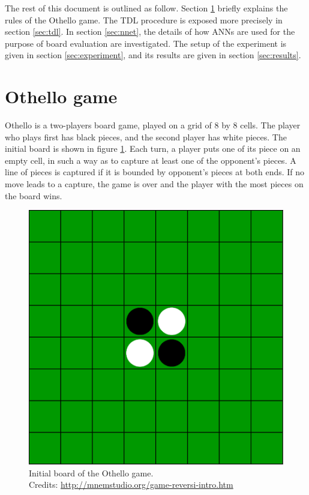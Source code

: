 \documentclass[a4paper, 9pt, twoside, twocolumn]{article}
\begin{document}
The rest of this document is outlined as follow. Section \ref{sec:othello} briefly
explains the rules of the Othello game. The TDL procedure is exposed more
precisely in section \ref{sec:tdl}. In section \ref{sec:nnet}, the details of
how ANNs are used for the purpose of board evaluation are investigated. The
setup of the experiment is given in section \ref{sec:experiment}, and its results
are given in section \ref{sec:results}.

\section{Othello game}
\label{sec:othello}
Othello is a two-players board game, played on a grid of 8 by 8 cells. The
player who plays first has black pieces, and the second player has white pieces.
The initial board is shown in figure \ref{othello_start}. Each turn, a player
puts one of its piece on an empty cell, in such a way as to capture at least one
of the opponent's pieces. A line of pieces is captured if it is bounded by
opponent's pieces at both ends. If no move leads to a capture, the game is over
and the player with the most pieces on the board wins.
\begin{figure}
    \centering
    \includegraphics[width=0.75\linewidth]{othello}
    \caption{Initial board of the Othello game.\\
    Credits: \url{http://mnemstudio.org/game-reversi-intro.htm}}
    \label{othello_start}
\end{figure}
\end{document}
